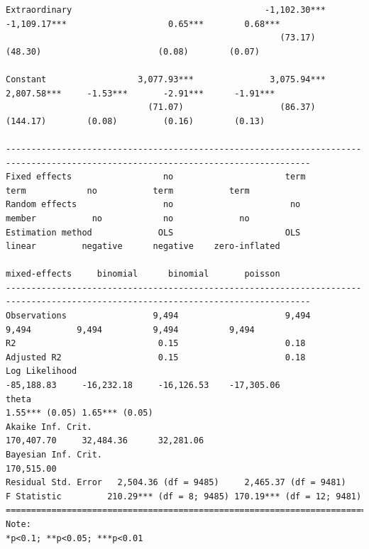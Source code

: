 \documentclass[letter,12pt]{article}
\begin{document}
\begin{table}
\begin{tiny}
\begin{verbatim}
Extraordinary                                      -1,102.30***        -1,109.17***                    0.65***        0.68***   
                                                      (73.17)             (48.30)                       (0.08)        (0.07)    
                                                                                                                                
Constant                  3,077.93***               3,075.94***         2,807.58***     -1.53***       -2.91***      -1.91***   
                            (71.07)                   (86.37)            (144.17)        (0.08)         (0.16)        (0.13)    
                                                                                                                                
----------------------------------------------------------------------------------------------------------------------------------
Fixed effects                  no                      term                term            no           term           term
Random effects                 no                       no                member           no            no             no
Estimation method             OLS                      OLS                linear         negative      negative    zero-inflated
                                                                       mixed-effects     binomial      binomial       poisson   
----------------------------------------------------------------------------------------------------------------------------------
Observations                 9,494                     9,494               9,494         9,494          9,494          9,494    
R2                            0.15                     0.18                                                                     
Adjusted R2                   0.15                     0.18                                                                     
Log Likelihood                                                          -85,188.83     -16,232.18     -16,126.53    -17,305.06 
theta                                                                                1.55*** (0.05) 1.65*** (0.05)             
Akaike Inf. Crit.                                                       170,407.70     32,484.36      32,281.06                
Bayesian Inf. Crit.                                                     170,515.00                                              
Residual Std. Error   2,504.36 (df = 9485)     2,465.37 (df = 9481)                                                             
F Statistic         210.29*** (df = 8; 9485) 170.19*** (df = 12; 9481)                                                          
==================================================================================================================================
Note:                                                                                                  *p<0.1; **p<0.05; ***p<0.01
\end{verbatim}
  \end{tiny}
  \caption{Models of legislative debate (standard errors in parentheses)} 
  \label{T:regs} 
\end{table} 
\end{document}
